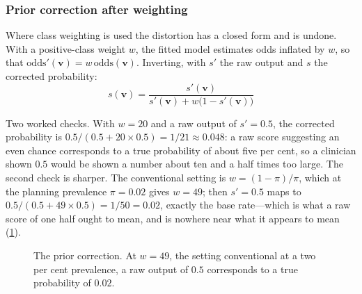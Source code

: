\documentclass[12pt,a4paper,oneside]{report}
\begin{document}
\subsubsection{Prior correction after weighting}\label{sec:prior-correction}

Where class weighting is used the distortion has a closed form and is undone. With a positive-class weight $w$, the fitted model estimates odds inflated by $w$, so that $\mathrm{odds}'(\mathbf{v}) = w\,\mathrm{odds}(\mathbf{v})$. Inverting, with $s'$ the raw output and $s$ the corrected probability:
\begin{equation}
  \boxed{\;s(\mathbf{v}) = \frac{s'(\mathbf{v})}{s'(\mathbf{v}) + w\bigl(1 - s'(\mathbf{v})\bigr)}\;}
\end{equation}

Two worked checks. With $w = 20$ and a raw output of $s' = 0.5$, the corrected probability is $0.5/(0.5 + 20 \times 0.5) = 1/21 \approx 0.048$: a raw score suggesting an even chance corresponds to a true probability of about five per cent, so a clinician shown $0.5$ would be shown a number about ten and a half times too large. The second check is sharper. The conventional setting is $w = (1-\pi)/\pi$, which at the planning prevalence $\pi = 0.02$ gives $w = 49$; then $s' = 0.5$ maps to $0.5/(0.5 + 49 \times 0.5) = 1/50 = 0.02$, exactly the base rate---which is what a raw score of one half ought to mean, and is nowhere near what it appears to mean (\cref{fig:prior-correction}).

\begin{figure}[htbp]
\centering
{}
\caption{The prior correction. At $w=49$, the setting conventional at a two per cent prevalence, a raw output of $0.5$ corresponds to a true probability of $0.02$.}\label{fig:prior-correction}
\end{figure}
\end{document}
